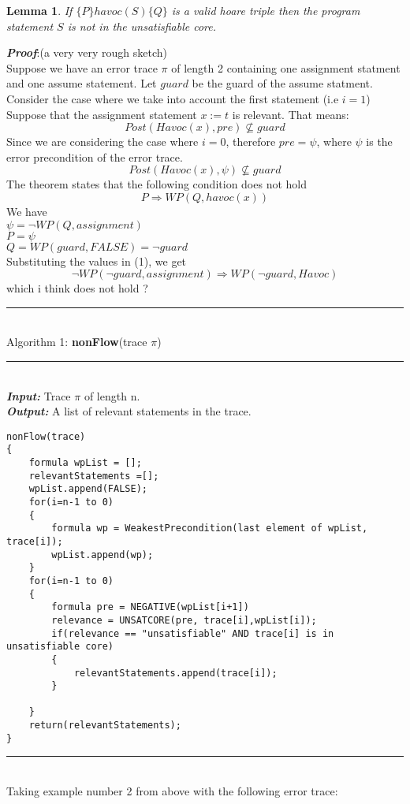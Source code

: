 \documentclass{article}
\newtheorem{lemma}{Lemma}
\begin{document}
\begin{lemma}
If $\lbrace P \rbrace havoc(S) \lbrace Q \rbrace$ is a valid hoare triple then the program statement $S$ is not in the unsatisfiable core.
\end{lemma}
\textit{\textbf{Proof}}:(a very very rough sketch)\\
Suppose we have an error trace $\pi$ of length 2 containing one assignment statment and one assume statement. Let $guard$ be the guard of the assume statment.\\
Consider the case where we take into account the first statement (i.e $i=1$)\\
Suppose that the assignment statement $x:=t$ is relevant. That means:
$$Post(Havoc(x), pre) \not \subseteq guard$$
Since we are considering the case where $i=0$, therefore $pre=\psi$, where $\psi$ is the error precondition of the error trace.
$$Post(Havoc(x), \psi) \not \subseteq guard$$
The theorem states that the following condition does not hold 
\begin{equation} 
P \Rightarrow WP(Q,havoc(x)) 
\end{equation}
We have\\
$\psi = \neg WP(Q, assignment)$\\
$P =  \psi$\\
$Q = WP(guard, FALSE) = \neg guard$\\
Substituting the values in (1), we get
$$ \neg WP(\neg guard, assignment) \Rightarrow WP(\neg guard, Havoc)$$
which i think does not hold ?


\newpage
\rule{\textwidth}{1pt}\\
Algorithm 1: \textbf{nonFlow}(trace $\pi$)\\
\noindent\rule{12cm}{0.4pt}\\
\textbf{\textit{Input:}} Trace $\pi$ of length n.\\
\textbf{\textit{Output:}} A list of relevant statements in the trace.
\begin{lstlisting}
nonFlow(trace)
{
	formula wpList = [];
	relevantStatements =[];
	wpList.append(FALSE);
	for(i=n-1 to 0)
	{
		formula wp = WeakestPrecondition(last element of wpList, trace[i]);
		wpList.append(wp);
	}
	for(i=n-1 to 0)
	{
		formula pre = NEGATIVE(wpList[i+1])
		relevance = UNSATCORE(pre, trace[i],wpList[i]);
		if(relevance == "unsatisfiable" AND trace[i] is in unsatisfiable core)
		{
			relevantStatements.append(trace[i]);
		}
		
	}
	return(relevantStatements);
}
\end{lstlisting}
\rule{\textwidth}{1pt}\\
Taking example number 2 from above with the following error trace:
\end{document}
